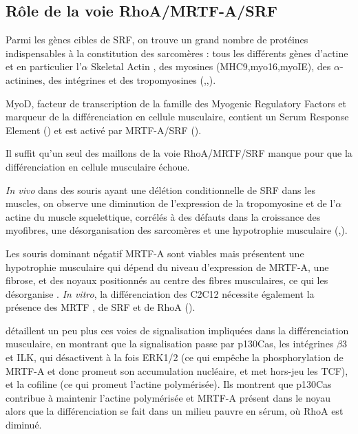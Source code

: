 \subsection{Rôle de la voie RhoA/MRTF-A/SRF}

Parmi les gènes cibles de SRF, on trouve un grand nombre de protéines indispensables à la constitution des sarcomères :  tous les différents gènes d'actine et en particulier l'$\alpha$ Skeletal Actin , des myosines (MHC9,myo16,myoIE), des $\alpha$-actinines, des intégrines et des tropomyosines (\cite{selvaraj_megakaryoblastic_2003},\cite{charvet_new_2006},\cite{esnault_rho-actin_2014}).

MyoD, facteur de transcription de la famille des Myogenic Regulatory Factors et marqueur de la différenciation en cellule musculaire, contient un Serum Response Element (\cite{lhonore_myod_2003}) et est activé par MRTF-A/SRF (\cite{mokalled_mastr_2012}). 

Il suffit qu'un seul des maillons de la voie RhoA/MRTF/SRF manque pour que la différenciation en cellule musculaire échoue. 

\textit{In vivo} dans des souris ayant une délétion conditionnelle de SRF dans les muscles, on observe une diminution de l'expression de la tropomyosine et de l'$\alpha$ actine du muscle squelettique, corrélés à des défauts dans la croissance des myofibres, une désorganisation des sarcomères et une hypotrophie musculaire (\cite{charvet_new_2006},\cite{li_requirement_2005}). 

Les souris dominant négatif MRTF-A sont viables mais présentent une hypotrophie musculaire qui dépend du niveau d'expression de MRTF-A, une fibrose, et des noyaux positionnés au centre des fibres musculaires, ce qui les désorganise \parencite{li_requirement_2005}. \textit{In vitro}, la différenciation des C2C12 nécessite également la présence des MRTF \parencite{selvaraj_megakaryoblastic_2003}, de SRF et de RhoA (\cite{wei_rhoa_1998}). 

\cite{kawauchi_p130cas-dependent_2012} détaillent un peu plus ces voies de signalisation impliquées dans la différenciation musculaire, en montrant que la signalisation passe par p130Cas, les intégrines $\beta$3 et ILK, qui désactivent à la fois ERK1/2 (ce qui empêche la phosphorylation de MRTF-A et donc promeut son accumulation nucléaire, et met hors-jeu les TCF), et la cofiline (ce qui promeut l'actine polymérisée). Ils montrent que p130Cas contribue à maintenir l'actine polymérisée et MRTF-A présent dans le noyau alors que la différenciation se fait dans un milieu pauvre en sérum, où RhoA est diminué. 
 
